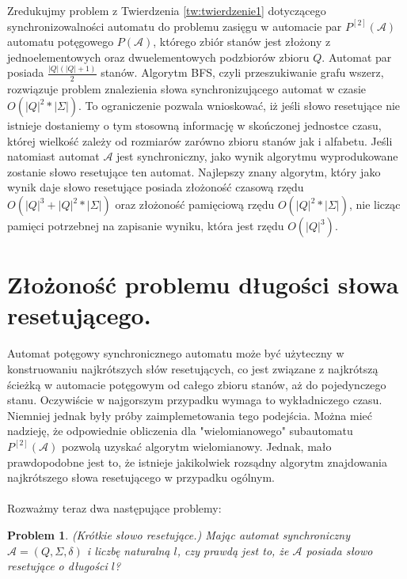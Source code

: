 \documentclass[12pt,a4paper]{article}
\newtheorem{pro}{Problem}[section]
\begin{document}
Zredukujmy problem z Twierdzenia \ref{tw:twierdzenie1} dotycz\k{a}cego synchronizowalno\'{s}ci automatu do problemu zasi\k{e}gu w automacie par $P^{[2]}(\mathscr{A})$ automatu pot\k{e}gowego $P(\mathscr{A})$, kt\'{o}rego zbi\'{o}r stan\'{o}w jest z{\l}o\.{z}ony z jednoelementowych oraz dwuelementowych podzbior\'{o}w zbioru $Q$. Automat par posiada $\frac{|Q|(|Q|+1)}{2}$ stan\'{o}w. Algorytm BFS, czyli przeszukiwanie grafu wszerz, rozwi\k{a}zuje problem znalezienia s{\l}owa synchronizuj\k{a}cego automat w czasie $O(|Q|^2*|\Sigma|)$. To ograniczenie pozwala wnioskowa\'{c}, i\.{z} je\'{s}li s{\l}owo resetuj\k{a}ce nie istnieje dostaniemy o tym stosown\k{a} informacj\k{e} w sko\'{n}czonej jednostce czasu, kt\'{o}rej wielko\'{s}\'{c} zale\.{z}y od rozmiar\'{o}w zar\'{o}wno zbioru stan\'{o}w jak i alfabetu. Je\'{s}li natomiast automat $\mathscr{A}$ jest synchroniczny, jako wynik algorytmu wyprodukowane zostanie s{\l}owo resetuj\k{a}ce ten automat. Najlepszy znany algorytm, kt\'{o}ry jako wynik daje s{\l}owo resetuj\k{a}ce posiada z{\l}o\.{z}ono\'{s}\'{c} czasow\k{a} rz\k{e}du $O(|Q|^3+|Q|^2*|\Sigma|)$ oraz z{\l}o\.{z}ono\'{s}\'{c} pami\k{e}ciow\k{a} rz\k{e}du $O(|Q|^2*|\Sigma|)$, nie licz\k{a}c pami\k{e}ci potrzebnej na zapisanie wyniku, kt\'{o}ra jest rz\k{e}du $O(|Q|^3)$.


\section{Z{\l}o\.zono\'s\'c problemu d{\l}ugo\'{s}ci s{\l}owa resetuj\k{a}cego.}

Automat pot\k{e}gowy synchronicznego automatu mo\.ze by\'c u\.zyteczny w konstruowaniu najkr\'otszych s{\l}\'ow resetuj\k{a}cych, co jest zwi\k{a}zane z najkr\'otsz\k{a} \'scie\.zk\k{a} w automacie pot\k{e}gowym od ca{\l}ego zbioru stan\'ow, a\.z do pojedynczego stanu. Oczywi\'scie w najgorszym przypadku wymaga to wyk{\l}adniczego czasu. Niemniej jednak by{\l}y pr\'oby zaimplemetowania tego podej\'scia. Mo\.zna mie\'c nadziej\k{e}, \.ze odpowiednie obliczenia dla "wielomianowego" subautomatu $P^{[2]}(\mathscr{A})$ pozwol\k{a} uzyska\'c algorytm wielomianowy. Jednak, ma{\l}o prawdopodobne jest to, \.ze istnieje jakikolwiek rozs\k{a}dny algorytm znajdowania najkr\'otszego s{\l}owa resetuj\k{a}cego w przypadku og\'olnym.\\ 
\\
Rozwa\.zmy teraz dwa nast\k{e}puj\k{a}ce problemy:

\begin{pro}
(Kr\'otkie s{\l}owo resetuj\k{a}ce.) Maj\k{a}c automat synchroniczny  $\mathscr{A}=(Q, \Sigma, \delta)$ i liczb\k{e} naturaln\k{a} $l$, czy prawd\k{a} jest to, \.ze $\mathscr{A}$ posiada s{\l}owo resetuj\k{a}ce o d{\l}ugo\'sci $l$?
\end{pro}
\end{document}
